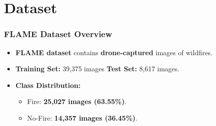 \section{Dataset}
\label{sec:dataset}

\begin{frame}
    \frametitle{FLAME Dataset Overview}
    \begin{itemize}
        \item \textbf{FLAME dataset} contains \textbf{drone-captured} images of wildfires.
        \item \textbf{Training Set:} 39,375 images \quad \textbf{Test Set:} 8,617 images.
        \item \textbf{Class Distribution:}
            \begin{itemize}
                \item Fire: \textbf{25,027 images (63.55\%)}.
                \item No-Fire: \textbf{14,357 images (36.45\%)}.
            \end{itemize}
    \end{itemize}
\end{frame}